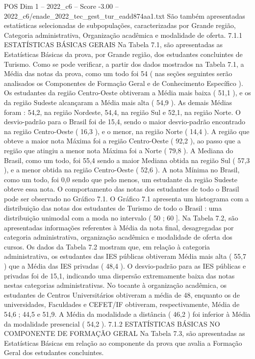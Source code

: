 \begin{textsample}{POS Dim 1 – 2022\_c6 – Score -3.00 – 2022\_c6/enade\_2022\_tec\_gest\_tur\_eadd874aa1.txt}
São também apresentadas estatísticas selecionadas de subpopulações, caracterizadas por Grande região, Categoria administrativa, Organização acadêmica e modalidade de oferta. 7.1.1 ESTATÍSTICAS BÁSICAS GERAIS Na Tabela 7.1, são apresentadas as Estatísticas Básicas da prova, por Grande região, dos estudantes concluintes de Turismo.
Como se pode verificar, a partir dos dados mostrados na Tabela 7.1, a Média das notas da prova, como um todo foi 54 ( nas seções seguintes serão analisados os Componentes de Formação Geral e de Conhecimento Específico ).
Os estudantes da região Centro-Oeste obtiveram a Média mais baixa ( 51,1 ), e os da região Sudeste alcançaram a Média mais alta ( 54,9 ).
As demais Médias foram : 54,2, na região Nordeste, 54,4, na região Sul e 52,1, na região Norte.
O desvio-padrão para o Brasil foi de 15,4, sendo o maior desvio-padrão encontrado na região Centro-Oeste ( 16,3 ), e o menor, na região Norte ( 14,4 ).
A região que obteve a maior nota Máxima foi a região Centro-Oeste ( 92,2 ), ao passo que a região que atingiu a menor nota Máxima foi a Norte ( 79,8 ).
A Mediana do Brasil, como um todo, foi 55,4 sendo a maior Mediana obtida na região Sul ( 57,3 ), e a menor obtida na região Centro-Oeste ( 52,6 ).
A nota Mínima no Brasil, como um todo, foi 0,0 sendo que pelo menos, um estudante da região Sudeste obteve essa nota.
O comportamento das notas dos estudantes de todo o Brasil pode ser observado no Gráfico 7.1.
O Gráfico 7.1 apresenta um histograma com a distribuição das notas dos estudantes de Turismo de todo o Brasil : uma distribuição unimodal com a moda no intervalo ( 50 ; 60 ].
Na Tabela 7.2, são apresentadas informações referentes à Média da nota final, desagregadas por categoria administrativa, organização acadêmica e modalidade de oferta dos cursos.
Os dados da Tabela 7.2 mostram que, em relação à categoria administrativa, os estudantes das IES públicas obtiveram Média mais alta ( 55,7 ) que a Média das IES privadas ( 48,4 ).
O desvio-padrão para as IES públicas e privadas foi de 15,1, indicando uma dispersão extremamente baixa das notas nestas categorias administrativas.
No tocante à organização acadêmica, os estudantes de Centros Universitários obtiveram a média de 48, enquanto os de universidades, Faculdades e CEFET/IF obtiveram, respectivamente, Média de 54,6 ; 44,5 e 51,9.
A Média da modalidade a distância ( 46,2 ) foi inferior à Média da modalidade presencial ( 54,2 ). 7.1.2 ESTATÍSTICAS BÁSICAS NO COMPONENTE DE FORMAÇÃO GERAL Na Tabela 7.3, são apresentadas as Estatísticas Básicas em relação ao componente da prova que avalia a Formação Geral dos estudantes concluintes.

\end{textsample}
